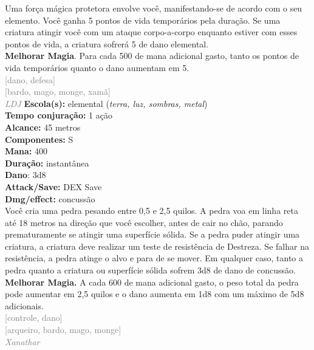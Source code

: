 \documentclass{RPG_Adventure}[2021/10/20]
\begin{document}
{\normalsize Uma força mágica protetora envolve você, manifestando-se de acordo com o seu elemento. Você ganha 5 pontos de vida temporários pela duração. Se uma criatura atingir você com um ataque corpo-a-corpo enquanto estiver com esses pontos de vida, a criatura sofrerá 5 de dano elemental.\\\t \textbf{Melhorar Magia}. Para cada 500 de mana adicional gasto, tanto os pontos de vida temporários quanto o dano aumentam em 5.\\}
{\scriptsize \textcolor{gray}{[dano, defesa]\\}}
{\scriptsize \textcolor{gray}{[bardo, mago, monge, xamã]\\}}
{\tiny \textcolor{gray}{\textit{LDJ}}}\jump{}
{\small \t \textbf{Escola(s):} elemental (\textit{terra, luz, sombras, metal})\\\t \textbf{Tempo conjuração:} 1 ação\\\t \textbf{Alcance:} 45 metros\\\t \textbf{Componentes:} S\\\t \textbf{Mana:} 400\\\t \textbf{Duração:} instantânea\\\t \textbf{Dano}: 3d8\\\t \textbf{Attack/Save:} DEX Save\\\t \textbf{Dmg/effect:} concussão\\}
{\normalsize Você cria uma pedra pesando entre 0,5 e 2,5 quilos. A pedra voa em linha reta até 18 metros na direção que você escolher, antes de cair no chão, parando prematuramente se atingir uma superfície sólida. Se a pedra puder atingir uma criatura, a criatura deve realizar um teste de resistência de Destreza. Se falhar na resistência, a pedra atinge o alvo e para de se mover. Em qualquer caso, tanto a pedra quanto a criatura ou superfície sólida sofrem 3d8 de dano de concussão.\\\t \textbf{Melhorar Magia.} A cada 600 de mana adicional gasto, o peso total da pedra pode aumentar em 2,5 quilos e o dano aumenta em 1d8 com um máximo de 5d8 adicionais.\\}
{\scriptsize \textcolor{gray}{[controle, dano]\\}}
{\scriptsize \textcolor{gray}{[arqueiro, bardo, mago, monge]\\}}
{\tiny \textcolor{gray}{\textit{Xanathar}}}\jump{}
\end{document}
